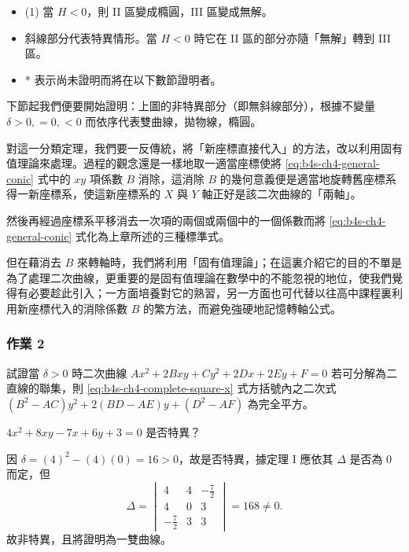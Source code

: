 \begin{itemize}
  \item[\textbf{註明}] (1) 當 $H < 0$，則 II 區變成橢圓，III 區變成無解。
  \item[(2)] 斜線部分代表特異情形。當 $H < 0$ 時它在 II 區的部分亦隨「無解」轉到 III 區。
  \item[(3)] * 表示尚未證明而將在以下數節證明者。
\end{itemize}

下節起我們便要開始證明：上圖的非特異部分（即無斜線部分），根據不變量 $\delta > 0, = 0, < 0$ 而依序代表雙曲線，拋物線，橢圓。

對這一分類定理，我們要一反傳統，將「新座標直接代入」的方法，改以利用固有值理論來處理。過程的觀念還是一樣地取一適當座標使將 \eqref{eq:b4s-ch4-general-conic} 式中的 $xy$ 項係數 $B$ 消除，這消除 $B$ 的幾何意義便是適當地旋轉舊座標系得一新座標系，使這新座標系的 $X$ 與 $Y$ 軸正好是該二次曲線的「兩軸」。

然後再經過座標系平移消去一次項的兩個或兩個中的一個係數而將 \eqref{eq:b4s-ch4-general-conic} 式化為上章所述的三種標準式。

但在藉消去 $B$ 來轉軸時，我們將利用「固有值理論」；在這裏介紹它的目的不單是為了處理二次曲線，更重要的是固有值理論在數學中的不能忽視的地位，使我們覺得有必要趁此引入；一方面培養對它的熟習，另一方面也可代替以往高中課程裏利用新座標代入的消除係數 $B$ 的繁方法，而避免強硬地記憶轉軸公式。

\subsubsection*{作業 2}
試證當 $\delta > 0$ 時二次曲線 $Ax^2 + 2Bxy + Cy^2 + 2Dx + 2Ey + F = 0$ 若可分解為二直線的聯集，則 \eqref{eq:b4s-ch4-complete-square-x} 式方括號內之二次式 $(B^2 - AC)y^2 + 2(BD - AE)y + (D^2 - AF)$ 為完全平方。

\begin{example}
$4x^2 + 8xy - 7x + 6y + 3 = 0$ 是否特異？
\end{example}

\begin{solution}
因 $\delta = (4)^2 - (4)(0) = 16 > 0$，故是否特異，據定理 I 應依其 $\Delta$ 是否為 0 而定，但
\[
\Delta = \begin{vmatrix} 4 & 4 & -\frac{7}{2} \\ 4 & 0 & 3 \\ -\frac{7}{2} & 3 & 3 \end{vmatrix} = 168 \ne 0.
\]
故非特異，且將證明為一雙曲線。
\end{solution}

